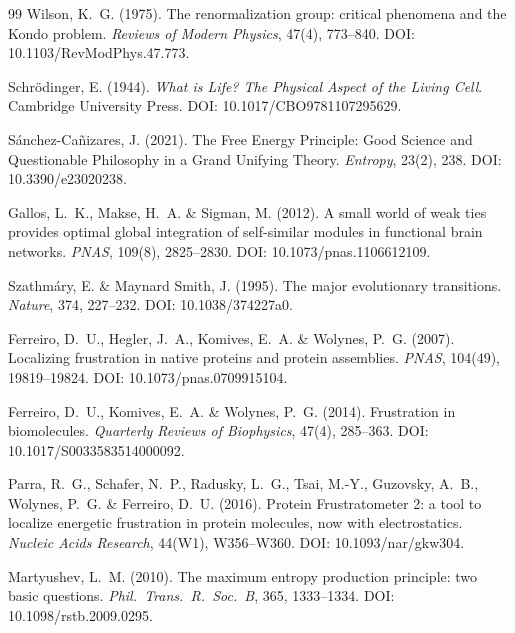 \documentclass[12pt,a4paper]{article}
\theoremstyle{remark}
\begin{document}
\begin{thebibliography}{99}
Wilson, K.~G. (1975).
\newblock The renormalization group: critical phenomena and the Kondo problem.
\newblock \textit{Reviews of Modern Physics}, 47(4), 773--840.
\newblock DOI: 10.1103/RevModPhys.47.773.

Schr{\"o}dinger, E. (1944).
\newblock \textit{What is Life? The Physical Aspect of the Living Cell}.
\newblock Cambridge University Press.
\newblock DOI: 10.1017/CBO9781107295629.

S{\'a}nchez-Ca{\~n}izares, J. (2021).
\newblock The Free Energy Principle: Good Science and Questionable Philosophy in a Grand Unifying Theory.
\newblock \textit{Entropy}, 23(2), 238.
\newblock DOI: 10.3390/e23020238.

Gallos, L.~K., Makse, H.~A. \& Sigman, M. (2012).
\newblock A small world of weak ties provides optimal global integration of self-similar modules in functional brain networks.
\newblock \textit{PNAS}, 109(8), 2825--2830.
\newblock DOI: 10.1073/pnas.1106612109.

Szathm{\'a}ry, E. \& Maynard Smith, J. (1995).
\newblock The major evolutionary transitions.
\newblock \textit{Nature}, 374, 227--232.
\newblock DOI: 10.1038/374227a0.

Ferreiro, D.~U., Hegler, J.~A., Komives, E.~A. \& Wolynes, P.~G. (2007).
\newblock Localizing frustration in native proteins and protein assemblies.
\newblock \textit{PNAS}, 104(49), 19819--19824.
\newblock DOI: 10.1073/pnas.0709915104.

Ferreiro, D.~U., Komives, E.~A. \& Wolynes, P.~G. (2014).
\newblock Frustration in biomolecules.
\newblock \textit{Quarterly Reviews of Biophysics}, 47(4), 285--363.
\newblock DOI: 10.1017/S0033583514000092.

Parra, R.~G., Schafer, N.~P., Radusky, L.~G., Tsai, M.-Y., Guzovsky, A.~B., Wolynes, P.~G. \& Ferreiro, D.~U. (2016).
\newblock Protein Frustratometer 2: a tool to localize energetic frustration in protein molecules, now with electrostatics.
\newblock \textit{Nucleic Acids Research}, 44(W1), W356--W360.
\newblock DOI: 10.1093/nar/gkw304.

Martyushev, L.~M. (2010).
\newblock The maximum entropy production principle: two basic questions.
\newblock \textit{Phil.\ Trans.\ R.\ Soc.\ B}, 365, 1333--1334.
\newblock DOI: 10.1098/rstb.2009.0295.


\end{thebibliography}
\end{document}
